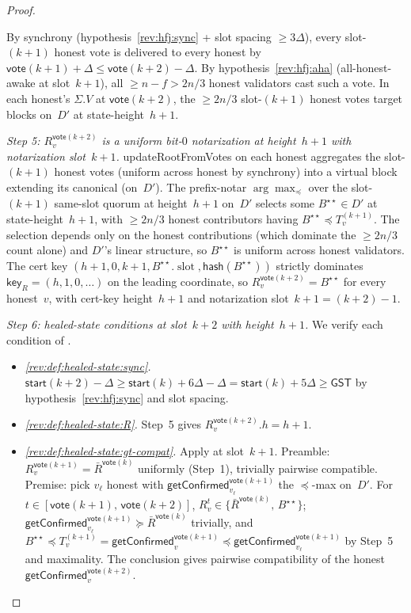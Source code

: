 \documentclass{article}
\newcommand{\slot}[0]{\ensuremath{\operatorname{\mathrm{slot}}}}
\newcommand{\hash}{\mathsf{hash}}
\newcommand{\key}{\mathsf{key}}
\newcommand{\start}{\mathsf{start}}
\newcommand{\vote}{\mathsf{vote}}
\newcommand{\comm}[1]{\bar{#1}}
\newcommand{\updateRootFromVotes}{\textsf{updateRootFromVotes}\xspace}
\newcommand{\getConfirmed}{\textsf{getConfirmed}\xspace}
\theoremstyle{plain}
\theoremstyle{definition}
\theoremstyle{remark}
\newcommand{\GST}{\ensuremath{\mathsf{GST}}}
\newcommand{\AHA}{all-honest-awake\xspace}
\begin{document}
\begin{proof}
\begin{description}
By synchrony (hypothesis~\ref{rev:hfj:sync} + slot spacing $\geq 3\Delta$), every slot-$(k+1)$ honest vote is delivered to every honest by $\vote(k+1) + \Delta \leq \vote(k+2) - \Delta$. By hypothesis~\ref{rev:hfj:aha} (\AHA at slot~$k+1$), all $\geq n - f > 2n/3$ honest validators cast such a vote. In each honest's $\Sigma.V$ at $\vote(k+2)$, the $\geq 2n/3$ slot-$(k+1)$ honest votes target blocks on~$D'$ at state-height~$h+1$.

\emph{Step 5: $R_v^{\vote(k+2)}$ is a uniform bit-$0$ notarization at height~$h+1$ with notarization slot~$k+1$.}
\updateRootFromVotes{} on each honest aggregates the slot-$(k+1)$ honest votes (uniform across honest by synchrony) into a virtual block extending its canonical (on~$D'$). The prefix-notar $\arg\max_\preceq$ over the slot-$(k+1)$ same-slot quorum at height~$h+1$ on~$D'$ selects some $B^{\star\star} \in D'$ at state-height~$h+1$, with $\geq 2n/3$ honest contributors having $B^{\star\star} \preceq T_v^{(k+1)}$. The selection depends only on the honest contributions (which dominate the $\geq 2n/3$ count alone) and $D'$'s linear structure, so $B^{\star\star}$ is uniform across honest validators. The cert key $(h+1, 0, k+1, B^{\star\star}.\slot, \hash(B^{\star\star}))$ strictly dominates $\key_R = (h, 1, 0, \ldots)$ on the leading coordinate, so $R_v^{\vote(k+2)} = B^{\star\star}$ for every honest~$v$, with cert-key height~$h+1$ and notarization slot~$k+1 = (k+2) - 1$.

\emph{Step 6: healed-state conditions at slot~$k+2$ with height~$h+1$.}
We verify each condition of .
\begin{itemize}
  \item \emph{\ref{rev:def:healed-state:sync}.}
  $\start(k+2) - \Delta \geq \start(k) + 6\Delta - \Delta = \start(k) + 5\Delta \geq \GST$ by hypothesis~\ref{rev:hfj:sync} and slot spacing.

  \item \emph{\ref{rev:def:healed-state:R}.}
  Step~5 gives $R_v^{\vote(k+2)}.h = h+1$.

  \item \emph{\ref{rev:def:healed-state:gt-compat}.}
  Apply  at slot~$k+1$. Preamble: $R_v^{\vote(k+1)} = \comm{R}^{\vote(k)}$ uniformly (Step~1), trivially pairwise compatible. Premise: pick $v_\ell$ honest with $\getConfirmed_{v_\ell}^{\vote(k+1)}$ the $\preceq$-max on~$D'$. For $t \in [\vote(k+1),\, \vote(k+2)]$, $R_v^t \in \{\comm{R}^{\vote(k)},\, B^{\star\star}\}$; $\getConfirmed_{v_\ell}^{\vote(k+1)} \succeq \comm{R}^{\vote(k)}$ trivially, and $B^{\star\star} \preceq T_v^{(k+1)} = \getConfirmed_v^{\vote(k+1)} \preceq \getConfirmed_{v_\ell}^{\vote(k+1)}$ by Step~5 and maximality. The conclusion gives pairwise compatibility of the honest $\getConfirmed_v^{\vote(k+2)}$.


\end{itemize}
\end{description}
\end{proof}
\end{document}
